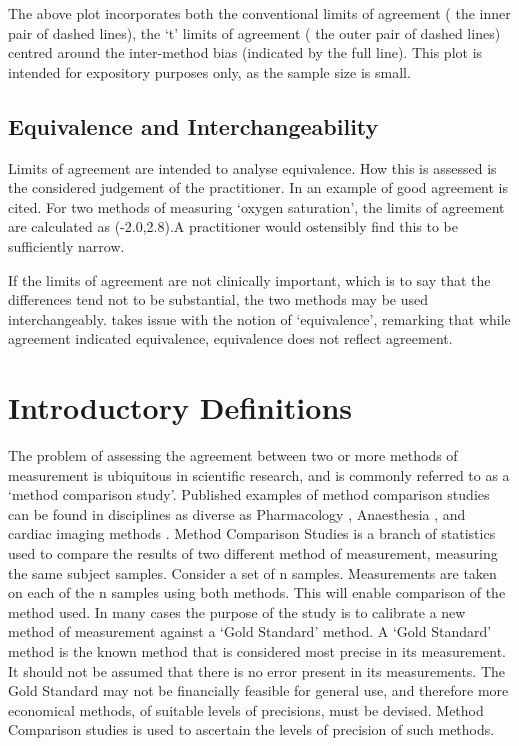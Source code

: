 \documentclass[12pt, a4paper]{report}
\theoremstyle{plain}
\theoremstyle{definition}
\theoremstyle{remark}
\begin{document}
	The above plot incorporates both the conventional limits of
	agreement ( the inner pair of dashed lines), the `t' limits of
	agreement ( the outer pair of dashed lines) centred around the
	inter-method bias (indicated by the full line). This plot is
	intended for expository purposes only, as the sample size is
	small.
	
	
	
	
	
	\subsection{Equivalence and Interchangeability}
	Limits of agreement are intended to analyse equivalence. How this
	is assessed is the considered judgement of the practitioner. In
	\citet{BA86} an example of good agreement is cited. For two
	methods of measuring `oxygen saturation', the limits of agreement
	are calculated as (-2.0,2.8).A practitioner would ostensibly find
	this to be sufficiently narrow.
	
	If the limits of agreement are not clinically important, which is
	to say that the differences tend not to be substantial, the two
	methods may be used interchangeably. \citet{DunnSEME} takes issue
	with the notion of `equivalence', remarking that while agreement
	indicated equivalence, equivalence does not reflect agreement.
	
	
	
	
	\section{Introductory Definitions}
	
	
	
	
	The problem of assessing the agreement between two or more methods of measurement is ubiquitous in scientific research, and is commonly referred to as a `method comparison study'. Published examples of method comparison studies can be found in disciplines
	as diverse as Pharmacology \citep{ludbrook97}, Anaesthesia \citep{Myles}, and cardiac imaging methods \citep{Krumm}.
	\smallskip
	Method Comparison Studies is a branch of statistics used to compare the results of two different method of measurement, measuring the same subject samples. Consider a set of n samples. Measurements are taken on each of the n samples using both methods. This will enable comparison of the method used.
	\smallskip
	In many cases the purpose of the study is to calibrate a new method of measurement against a ‘Gold Standard’ method. A ‘Gold Standard’ method is the known method that is considered most precise in its measurement. It should not be assumed that there is no error present in its measurements.
	\smallskip
	The Gold Standard may not be financially feasible for general use, and therefore more economical methods, of suitable levels of precisions, must be devised. Method Comparison studies is used to ascertain the levels of precision of such methods.
	\smallskip
	
\end{document}

